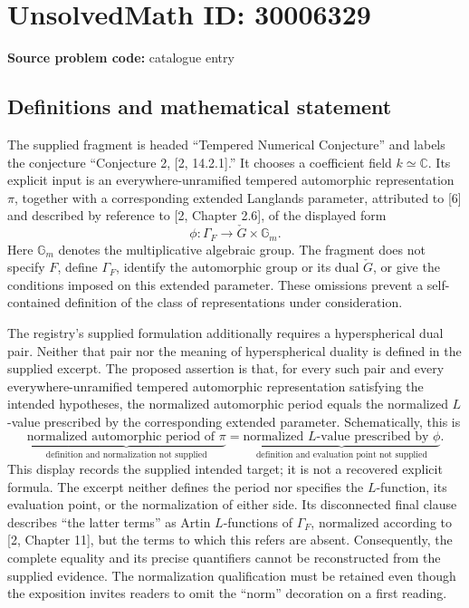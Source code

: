 \documentclass[11pt]{article}
\newcommand{\C}{\mathbb{C}}
\begin{document}
\section*{UnsolvedMath ID: 30006329}
\textbf{Source problem code:} catalogue entry
\subsection{Definitions and mathematical statement}
The supplied fragment is headed ``Tempered Numerical Conjecture'' and labels the conjecture ``Conjecture 2, [2, 14.2.1].'' It chooses a coefficient field \(k\simeq\C\). Its explicit input is an everywhere-unramified tempered automorphic representation \(\pi\), together with a corresponding extended Langlands parameter, attributed to [6] and described by reference to [2, Chapter 2.6], of the displayed form
\[
\phi\colon\Gamma_F\longrightarrow\check G\times\mathbb G_m.
\]
Here \(\mathbb G_m\) denotes the multiplicative algebraic group. The fragment does not specify \(F\), define \(\Gamma_F\), identify the automorphic group or its dual \(\check G\), or give the conditions imposed on this extended parameter. These omissions prevent a self-contained definition of the class of representations under consideration.

The registry's supplied formulation additionally requires a hyperspherical dual pair. Neither that pair nor the meaning of hyperspherical duality is defined in the supplied excerpt. The proposed assertion is that, for every such pair and every everywhere-unramified tempered automorphic representation satisfying the intended hypotheses, the normalized automorphic period equals the normalized \(L\)-value prescribed by the corresponding extended parameter. Schematically, this is
\[
\underbrace{\text{normalized automorphic period of }\pi}_{\text{definition and normalization not supplied}}
=
\underbrace{\text{normalized }L\text{-value prescribed by }\phi}_{\text{definition and evaluation point not supplied}}.
\]
This display records the supplied intended target; it is not a recovered explicit formula. The excerpt neither defines the period nor specifies the \(L\)-function, its evaluation point, or the normalization of either side. Its disconnected final clause describes ``the latter terms'' as Artin \(L\)-functions of \(\Gamma_F\), normalized according to [2, Chapter 11], but the terms to which this refers are absent. Consequently, the complete equality and its precise quantifiers cannot be reconstructed from the supplied evidence. The normalization qualification must be retained even though the exposition invites readers to omit the ``norm'' decoration on a first reading.
\end{document}

